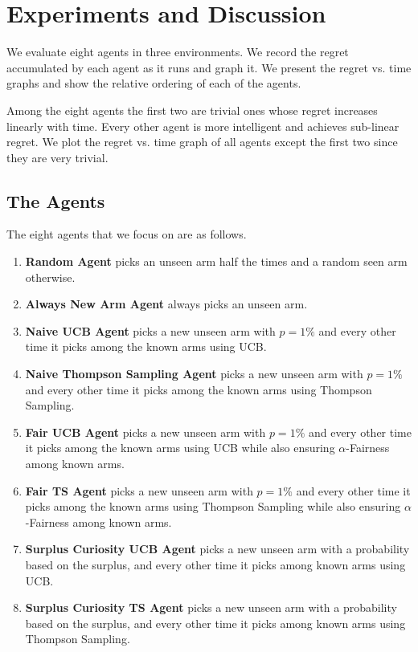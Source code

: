 \section{Experiments and Discussion}

We evaluate eight agents in three environments. We record the regret accumulated by each agent as it runs and graph it. We present the regret vs. time graphs and show the relative ordering of each of the agents.

Among the eight agents the first two are trivial ones whose regret increases linearly with time. Every other agent is more intelligent and achieves sub-linear regret. We plot the regret vs. time graph of all agents except the first two since they are very trivial.

\subsection{The Agents}

The eight agents that we focus on are as follows.

\begin{enumerate}
    \item \textbf{Random Agent} picks an unseen arm half the times and a random seen arm otherwise.
    \item \textbf{Always New Arm Agent} always picks an unseen arm.
    \item \textbf{Naive UCB Agent} picks a new unseen arm with $p=1\%$ and every other time it picks among the known arms using UCB.
    \item \textbf{Naive Thompson Sampling Agent} picks a new unseen arm with $p=1\%$ and every other time it picks among the known arms using Thompson Sampling.
    \item \textbf{Fair UCB Agent} picks a new unseen arm with $p=1\%$ and every other time it picks among the known arms using UCB while also ensuring $\alpha$-Fairness among known arms.
    \item \textbf{Fair TS Agent} picks a new unseen arm with $p=1\%$ and every other time it picks among the known arms using Thompson Sampling while also ensuring $\alpha$-Fairness among known arms.
    \item \textbf{Surplus Curiosity UCB Agent} picks a new unseen arm with a probability based on the surplus, and every other time it picks among known arms using UCB.
    \item \textbf{Surplus Curiosity TS Agent} picks a new unseen arm with a probability based on the surplus, and every other time it picks among known arms using Thompson Sampling.
\end{enumerate}

